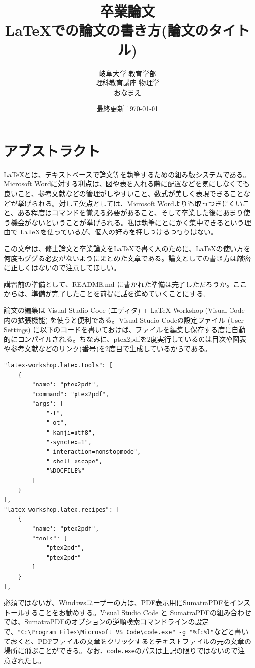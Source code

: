 \documentclass[a4j]{jsarticle}
\title{\vspace{60mm} \large 卒業論文\vspace{10mm}\\ \LARGE\LaTeX での論文の書き方(論文のタイトル)\vspace{5mm}}
\author{\large 岐阜大学 教育学部 \\ \vspace{5mm}
\large 理科教育講座 物理学 \\ \vspace{5mm}
\large おなまえ}
\date{最終更新 \today}
\begin{document}
\maketitle
\thispagestyle{empty} %
\newpage %
\tableofcontents %
\newpage %
\section*{アブストラクト}

\LaTeX とは、テキストベースで論文等を執筆するための組み版システムである。Microsoft Wordに対する利点は、図や表を入れる際に配置などを気にしなくても良いこと、参考文献などの管理がしやすいこと、数式が美しく表現できることなどが挙げられる。対して欠点としては、Microsoft Wordよりも取っつきにくいこと、ある程度はコマンドを覚える必要があること、そして卒業した後にあまり使う機会がないということが挙げられる。私は執筆にとにかく集中できるという理由で \LaTeX を使っているが、個人の好みを押しつけるつもりはない。

この文章は、修士論文と卒業論文を\LaTeX で書く人のために、\LaTeX の使い方を何度もググる必要がないようにまとめた文章である。論文としての書き方は厳密に正しくはないので注意してほしい。

講習前の準備として、README.md に書かれた準備は完了しただろうか。ここからは、準備が完了したことを前提に話を進めていくことにする。

論文の編集は Visual Studio Code (エディタ) + LaTeX Workshop (Visual Code内の拡張機能) を使うと便利である。Visual Studio Codeの設定ファイル (User Settings) に以下のコードを書いておけば、ファイルを編集し保存する度に自動的にコンパイルされる。ちなみに、ptex2pdfを2度実行しているのは目次や図表や参考文献などのリンク(番号)を2度目で生成しているからである。
\begin{verbatim}
"latex-workshop.latex.tools": [
    {
        "name": "ptex2pdf",
        "command": "ptex2pdf",
        "args": [
            "-l",
            "-ot",
            "-kanji=utf8",
            "-synctex=1",
            "-interaction=nonstopmode",
            "-shell-escape",
            "%DOCFILE%"
        ]
    }
],
"latex-workshop.latex.recipes": [
    {
        "name": "ptex2pdf",
        "tools": [
            "ptex2pdf",
            "ptex2pdf"
        ]
    }
],
\end{verbatim}

必須ではないが、Windowsユーザーの方は、PDF表示用にSumatraPDFをインストールすることをお勧めする。Visual Studio Code と SumatraPDFの組み合わせでは、SumatraPDFのオプションの逆順検索コマンドラインの設定で、\verb|"C:\Program Files\Microsoft VS Code\code.exe" -g "%f:%l"|などと書いておくと、PDFファイルの文章をクリックするとテキストファイルの元の文章の場所に飛ぶことができる。なお、\verb|code.exe|のパスは上記の限りではないので注意されたし。
\end{document}
